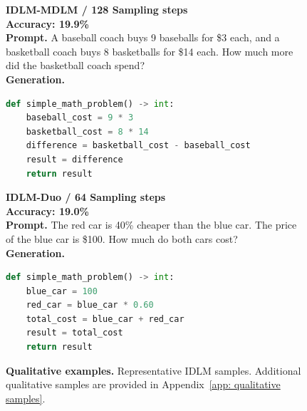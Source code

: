 \begin{figure}[t]
\begin{tcolorbox}
\vspace{-0.9mm}
\noindent{}
\vspace{-2.35mm}

\begin{minipage}[t]{0.485\linewidth}
{\footnotesize\bfseries\textcolor{tinyorange}{IDLM-MDLM / 128 Sampling steps}}\\[-0.2mm]
{\scriptsize\bfseries\textcolor{tinyorange}{Accuracy:} 19.9\%}\\[-0.1mm]
{\scriptsize\bfseries Prompt.}
{\scriptsize A baseball coach buys 9 baseballs for \$3 each, and a basketball coach buys 8 basketballs for \$14 each. How much more did the basketball coach spend?}\\[-0.1mm]
{\scriptsize\bfseries Generation.}\\[-2.4mm]
\begin{lstlisting}[language=Python,basicstyle=\ttfamily\tiny,columns=fullflexible,keepspaces=true,breaklines=true,aboveskip=0pt,belowskip=0pt,xleftmargin=0.08\linewidth,xrightmargin=0.08\linewidth]
def simple_math_problem() -> int:
    baseball_cost = 9 * 3
    basketball_cost = 8 * 14
    difference = basketball_cost - baseball_cost
    result = difference
    return result
\end{lstlisting}
\end{minipage}
\hfill
\begin{minipage}[t]{0.485\linewidth}
{\footnotesize\bfseries\textcolor{tinyorange}{IDLM-Duo / 64 Sampling steps}}\\[-0.2mm]
{\scriptsize\bfseries\textcolor{tinyorange}{Accuracy:} 19.0\%}\\[-0.1mm]
{\scriptsize\bfseries Prompt.}
{\scriptsize The red car is 40\% cheaper than the blue car. The price of the blue car is \$100. How much do both cars cost?}\\[-0.1mm]
{\scriptsize\bfseries Generation.}\\[-2.4mm]
\begin{lstlisting}[language=Python,basicstyle=\ttfamily\tiny,columns=fullflexible,keepspaces=true,breaklines=true,aboveskip=0pt,belowskip=0pt,xleftmargin=0.08\linewidth,xrightmargin=0.08\linewidth]
def simple_math_problem() -> int:
    blue_car = 100
    red_car = blue_car * 0.60
    total_cost = blue_car + red_car
    result = total_cost
    return result
\end{lstlisting}
\end{minipage}
\end{tcolorbox}
\caption{\textbf{Qualitative examples.} Representative IDLM samples. Additional qualitative samples are provided in Appendix~\ref{app: qualitative samples}.}
\label{fig:owt-qualitative}
\vspace{-4mm}
\end{figure}
